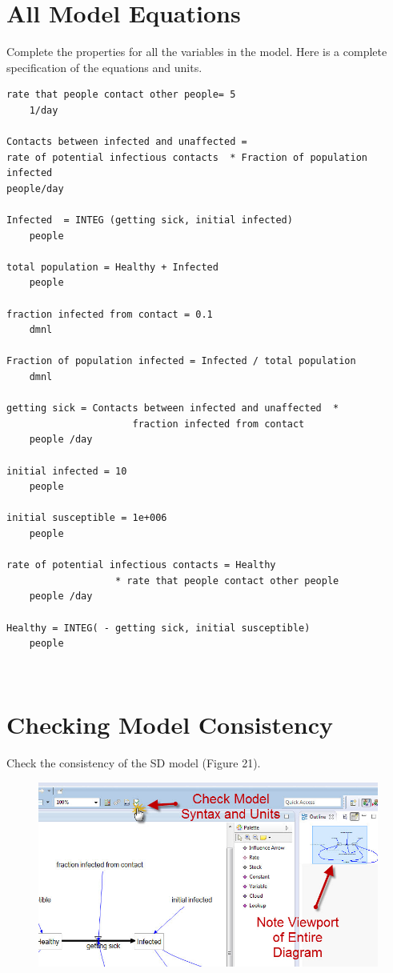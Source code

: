 \documentclass[11pt]{amsart}
\begin{document}
\section{All Model Equations}
Complete the properties for all the variables in the model. Here is a complete specification of the equations and units.

\begin{verbatim}
rate that people contact other people= 5
	1/day
	
Contacts between infected and unaffected = 
rate of potential infectious contacts  * Fraction of population infected
people/day

Infected  = INTEG (getting sick, initial infected)
	people

total population = Healthy + Infected
	people

fraction infected from contact = 0.1
	dmnl

Fraction of population infected = Infected / total population
	dmnl

getting sick = Contacts between infected and unaffected  * 
                      fraction infected from contact
	people /day

initial infected = 10
	people

initial susceptible = 1e+006
	people	

rate of potential infectious contacts = Healthy  
                   * rate that people contact other people
	people /day

Healthy = INTEG( - getting sick, initial susceptible)
	people
\end{verbatim}
 
\clearpage

\section{Checking Model Consistency}
Check the consistency of the SD model (Figure 21).



\begin{figure}[ht]
\begin{center}
\vspace{.2in}
\centerline {
\includegraphics[totalheight=0.4\textheight]{images/021.jpg}
}
\caption{}
\label{fig:021}
\end{center}
\end{figure}
\end{document}
